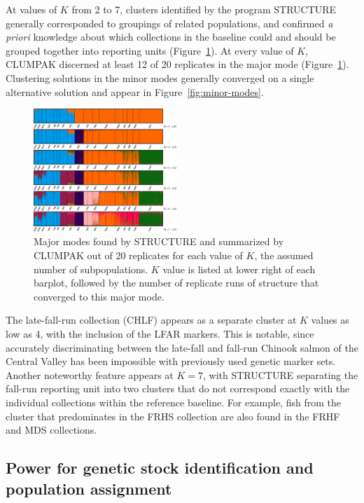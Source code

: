 At values of $K$ from 2 to 7, clusters identified by the program STRUCTURE
generally corresponded to groupings of related populations, and confirmed
{\em a priori} knowledge about which collections in the baseline could and should be
grouped together into reporting units (Figure~\ref{fig:struct}).  At every value of $K$, CLUMPAK discerned at least
12 of 20 replicates in the major mode (Figure~\ref{fig:struct}).   
Clustering solutions in the minor
modes generally converged on a single alternative solution and appear in Figure~\ref{fig:minor-modes}.
\begin{figure}
\newcommand{\structcap}{\footnotesize Major modes found by STRUCTURE and summarized
by CLUMPAK out of 20 replicates for each value of $K$, the assumed number of
subpopulations. $K$ value is listed at lower right of each barplot, followed by the number
of replicate runs of structure that converged to this major mode.}
\begin{center}
\includegraphics[width=0.48\textwidth]{images/clumpak-crop.pdf}
\end{center}
\caption[\structcap]{\structcap}
\label{fig:struct}
\end{figure}
The late-fall-run collection (CHLF) appears as a separate cluster at $K$ values
as low as 4, with the inclusion of the LFAR markers.  This is notable, since accurately discriminating between the late-fall and
fall-run Chinook salmon of the Central Valley has been impossible with previously used genetic marker sets.
Another noteworthy feature appears at $K=7$, with STRUCTURE separating the fall-run reporting unit
into two clusters that do not correspond exactly with the individual
collections within the reference baseline. For example, fish from the
cluster that predominates in the FRHS collection are also found in the FRHF and MDS collections.


\subsection*{Power for genetic stock identification and population assignment}

